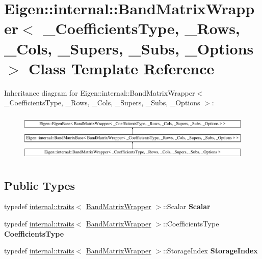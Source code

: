\hypertarget{class_eigen_1_1internal_1_1_band_matrix_wrapper}{}\section{Eigen\+::internal\+::Band\+Matrix\+Wrapper$<$ \+\_\+\+Coefficients\+Type, \+\_\+\+Rows, \+\_\+\+Cols, \+\_\+\+Supers, \+\_\+\+Subs, \+\_\+\+Options $>$ Class Template Reference}
\label{class_eigen_1_1internal_1_1_band_matrix_wrapper}
Inheritance diagram for Eigen\+::internal\+::Band\+Matrix\+Wrapper$<$ \+\_\+\+Coefficients\+Type, \+\_\+\+Rows, \+\_\+\+Cols, \+\_\+\+Supers, \+\_\+\+Subs, \+\_\+\+Options $>$\+:\begin{figure}[H]
\begin{center}
\leavevmode
\includegraphics[height=2.376238cm]{class_eigen_1_1internal_1_1_band_matrix_wrapper}
\end{center}
\end{figure}
\subsection*{Public Types}
\begin{DoxyCompactItemize}
\item 
\mbox{\label{class_eigen_1_1internal_1_1_band_matrix_wrapper_a4d9b3b75046e2d298f72cae7c9929a3f}} 
typedef \mbox{\hyperlink{struct_eigen_1_1internal_1_1traits}{internal\+::traits}}$<$ \mbox{\hyperlink{class_eigen_1_1internal_1_1_band_matrix_wrapper}{Band\+Matrix\+Wrapper}} $>$\+::Scalar {\bfseries Scalar}
\item 
\mbox{\label{class_eigen_1_1internal_1_1_band_matrix_wrapper_af2619600a9ac7189c920700acec2ed18}} 
typedef \mbox{\hyperlink{struct_eigen_1_1internal_1_1traits}{internal\+::traits}}$<$ \mbox{\hyperlink{class_eigen_1_1internal_1_1_band_matrix_wrapper}{Band\+Matrix\+Wrapper}} $>$\+::Coefficients\+Type {\bfseries Coefficients\+Type}
\item 
\mbox{\label{class_eigen_1_1internal_1_1_band_matrix_wrapper_a34e63430ed81b44a49dd339987e8ced6}} 
typedef \mbox{\hyperlink{struct_eigen_1_1internal_1_1traits}{internal\+::traits}}$<$ \mbox{\hyperlink{class_eigen_1_1internal_1_1_band_matrix_wrapper}{Band\+Matrix\+Wrapper}} $>$\+::Storage\+Index {\bfseries Storage\+Index}
\end{DoxyCompactItemize}
